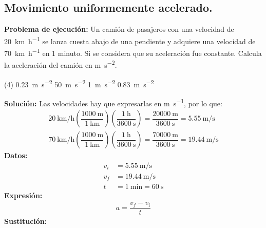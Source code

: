\documentclass[12pt, letter]{exam}
\begin{document}


\newpage

\begin{questions}
    \section{Movimiento uniformemente acelerado.}

    \question \label{Problema_01} \textbf{Problema de ejecución:} Un camión de pasajeros con una velocidad de \SI{20}{\kilo\meter\per\hour} se lanza cuesta abajo de una pendiente y adquiere una velocidad de \SI{70}{\kilo\meter\per\hour} en \num{1} minuto. Si se considera que su aceleración fue constante. Calcula la aceleración del camión en \unit{\meter\per\square\second}.
    \begin{tasks}(4)
        \task \SI{0.23}{\meter\per\square\second}
        \task \SI{50}{\meter\per\square\second}
        \task \SI{1}{\meter\per\square\second}
        \task \SI{0.83}{\meter\per\square\second}
    \end{tasks}
    \textbf{Solución:} Las velocidades hay que expresarlas en \unit{\meter\per\second}, por lo que:
    \begin{align*}
    \SI[per-mode=fraction]{20}{\kilo\meter\per\hour} \left( \dfrac{\SI{1000}{\meter}}{\SI{1}{\kilo\meter}} \right) \left( \dfrac{\SI{1}{\hour}}{\SI{3600}{\second}} \right) = \dfrac{\SI{20000}{\meter}}{\SI{3600}{\second}} = \SI[per-mode=fraction]{5.55}{\meter\per\second} \\[0.5em]
    \SI[per-mode=fraction]{70}{\kilo\meter\per\hour} \left( \dfrac{\SI{1000}{\meter}}{\SI{1}{\kilo\meter}} \right) \left( \dfrac{\SI{1}{\hour}}{\SI{3600}{\second}} \right) = \dfrac{\SI{70000}{\meter}}{\SI{3600}{\second}} = \SI[per-mode=fraction]{19.44}{\meter\per\second}
    \end{align*}
    \textbf{Datos:}
    \begin{align*}
    v_{i} &= \SI[per-mode=fraction]{5.55}{\meter\per\second} \\[0.5em]
    v_{f} &= \SI[per-mode=fraction]{19.44}{\meter\per\second} \\[0.5em]
    t &= \SI{1}{\minute} = \SI{60}{\second}
    \end{align*}
    \textbf{Expresión:}
    \begin{align*}
    a = \dfrac{v_{f} - v_{i}}{t}
    \end{align*}
    \textbf{Sustitución:}
    \begin{align*}

\end{align*}
\end{questions}
\end{document}
